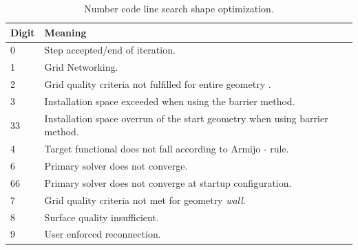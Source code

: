 \documentclass[oneside]{article}
\numberwithin{equation}{section}
\numberwithin{figure}{section}
\numberwithin{figure}{section}
\begin{document}
\begin{table}[h]
    \centering
    \begin{tabular}{|p{0.8cm}|l|} %
        \hline
        \cellcolor{light-gray} Digit & \cellcolor{light-gray} Meaning \\
        \hline
        0             & Step accepted/end of iteration.\\
        \hline
        1             & Grid Networking.\\
        \hline
        2             & Grid quality criteria not fulfilled for entire geometry .\\
        \hline 
        3             & Installation space exceeded when using the barrier method.\\
        \hline
        33            & Installation space overrun of the start geometry when using barrier method.\\
        \hline
        4             & Target functional does not fall according to Armijo - rule.\\
        \hline
        6             & Primary solver does not converge.\\
        \hline
        66            & Primary solver does not converge at startup configuration.\\
        \hline
        7             & Grid quality criteria not met for geometry \emph{wall}.\\
        \hline
        8             & Surface quality insufficient.\\
        \hline
        9             & User enforced reconnection.\\
        \hline
    \end{tabular}
    \caption{Number code line search shape optimization.}\label{tab:zahlencode}
\end{table}
\end{document}
